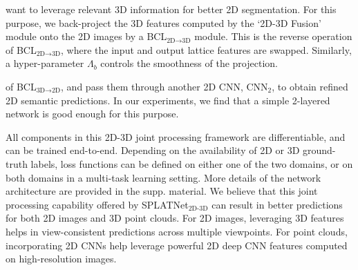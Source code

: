 \documentclass[10pt,twocolumn,letterpaper]{article}
\begin{document}
want to leverage relevant 3D information for better 2D segmentation. For this purpose, we back-project
the 3D features computed by the `2D-3D Fusion' module onto the 2D images by a BCL$_{\text{2D}\rightarrow\text{3D}}$ module. This is the reverse operation of BCL$_{\text{2D}\rightarrow\text{3D}}$, where the
input and output lattice features are swapped. Similarly, a hyper-parameter $\Lambda_b$ controls the smoothness of the projection.

of BCL$_{\text{3D}\rightarrow\text{2D}}$, and pass them through another 2D CNN, CNN$_2$, to obtain refined
2D semantic predictions. In our experiments, we find that a simple 2-layered network is good enough
for this purpose.


All components in this 2D-3D joint processing framework are differentiable, and can be trained end-to-end. Depending on the availability of 2D or 3D ground-truth labels, loss functions can be defined on either one of the two domains, or on both domains in a multi-task learning setting. More details of the network architecture
are provided in the supp. material. We believe that this joint processing capability offered by SPLATNet$_{\text{2D-3D}}$ can result in better predictions for both 2D images and 3D point clouds. For 2D images, leveraging 3D features helps in view-consistent predictions across multiple viewpoints. 
For point clouds, incorporating 2D CNNs help leverage powerful 2D deep CNN features computed on high-resolution images.
\end{document}
